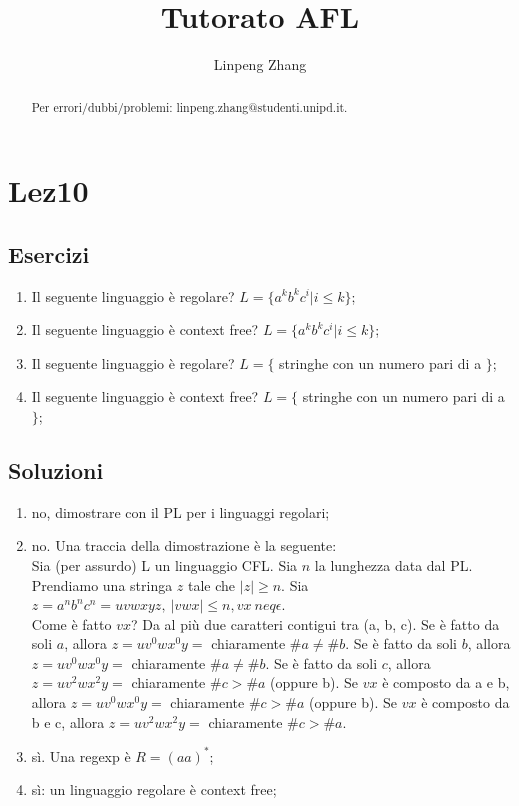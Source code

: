 \documentclass[a4paper,11pt]{article}
\begin{document}
\author{Linpeng Zhang}
\title{Tutorato AFL}
\maketitle
\begin{abstract}
    Per errori/dubbi/problemi: linpeng.zhang@studenti.unipd.it.
\end{abstract}
\tableofcontents
\section{Lez10}
\subsection{Esercizi}
\begin{enumerate}
    \item  Il seguente linguaggio è regolare? $L =\{ a^k b^k c^i | i\leq k\}$;
    \item  Il seguente linguaggio è context free? $L =\{ a^k b^k c^i | i\leq k\}$;
    \item  Il seguente linguaggio è regolare? $L =\{$ stringhe con un numero pari di a $\}$;
    \item  Il seguente linguaggio è context free? $L =\{$ stringhe con un numero pari di a $\}$;
\end{enumerate}
\subsection{Soluzioni}
\begin{enumerate}
    \item no, dimostrare con il PL per i linguaggi regolari;
    \item no. Una traccia della dimostrazione è la seguente:\\
    Sia (per assurdo) L un linguaggio CFL. Sia $n$ la lunghezza data dal PL. Prendiamo una stringa $z$ tale che $|z| \geq n$.
    Sia $z=a^nb^nc^n= uvwxyz, \ |vwx| \leq n, vx\ neq \epsilon$.\\
    Come è fatto $vx$? Da al più due caratteri contigui tra (a, b, c).
    Se è fatto da soli $a$, allora $z=uv^0wx^0y=$ chiaramente $\#a\neq \#b$.
    Se è fatto da soli $b$, allora $z=uv^0wx^0y=$ chiaramente $\#a\neq \#b$.
    Se è fatto da soli $c$, allora $z=uv^2wx^2y=$ chiaramente $\#c > \#a$ (oppure b).
    Se $vx$ è composto da a e b, allora $z=uv^0wx^0y=$ chiaramente $\#c > \#a$ (oppure b).
    Se $vx$ è composto da b e c, allora $z=uv^2wx^2y=$ chiaramente $\#c > \#a$.
    \item sì. Una regexp è $R=(aa)^{*}$;
    \item sì: un linguaggio regolare è context free;
\end{enumerate}
\end{document}
